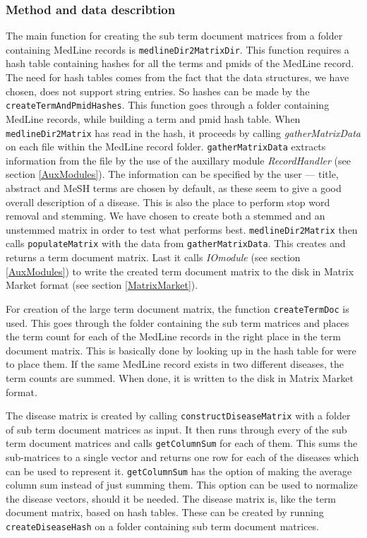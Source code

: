 \subsubsection{Method and data describtion}
The main function for creating the sub term document matrices from a
folder containing MedLine records is
\texttt{medlineDir2MatrixDir}. This function requires a hash table
containing hashes for all the terms and pmids of the MedLine
record. The need for hash tables comes from the fact that the data
structures, we have chosen, does not support string entries. So hashes
can be made by the \texttt{createTermAndPmidHashes}. This function
goes through a folder containing MedLine records, while building a
term and pmid hash table. When \texttt{medlineDir2Matrix} has read in
the hash, it proceeds by calling \textit{gatherMatrixData} on each
file within the MedLine record folder. \texttt{gatherMatrixData}
extracts information from the file by the use of the auxillary module
\textit{RecordHandler} (see section \ref{AuxModules}). The information
can be specified by the user --- title, abstract and MeSH terms are
chosen by default, as these seem to give a good overall description of
a disease. This is also the place to perform stop word removal and
stemming. We have chosen to create both a stemmed and an unstemmed
matrix in order to test what performs best. \texttt{medlineDir2Matrix} then
calls \texttt{populateMatrix} with the data from
\texttt{gatherMatrixData}. This creates and returns a term document
matrix. Last it calls \textit{IOmodule} (see section \ref{AuxModules}) to write
the created term document matrix to the disk in Matrix Market format
(see section \ref{MatrixMarket}).

For creation of the large term document matrix, the function
\texttt{createTermDoc} is used. This goes through the folder containing
the sub term matrices and places the term count for each of the
MedLine records in the right place in the term document matrix. This
is basically done by looking up in the hash table for were to place
them. If the same MedLine record exists in two different diseases, the
term counts are summed. When done, it is written to the disk in Matrix
Market format.

The disease matrix is created by calling
\texttt{constructDiseaseMatrix} with a folder of sub term document
matrices as input. It then runs through every of the sub term document
matrices and calls \texttt{getColumnSum} for each of them. This sums
the sub-matrices to a single vector and returns one row for each of
the diseases which can be used to represent it. \texttt{getColumnSum}
has the option of making the average column sum instead of just
summing them. This option can be used to normalize the disease
vectors, should it be needed. The disease matrix is, like the term
document matrix, based on hash tables. These can be created by running
\texttt{createDiseaseHash} on a folder containing sub term document
matrices.

